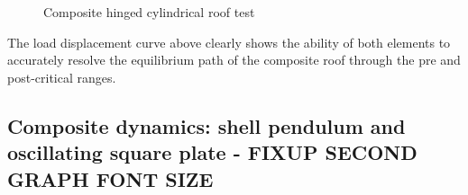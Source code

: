 \begin{figure}[H]
	\caption{\label{ref_label_overall}Composite hinged cylindrical roof test}
\end{figure}

The load displacement curve above clearly shows the ability of both elements to accurately resolve the equilibrium path of the composite roof through the pre and post-critical ranges.

\subsection{Composite dynamics: shell pendulum and oscillating square plate - FIXUP SECOND GRAPH FONT SIZE}


